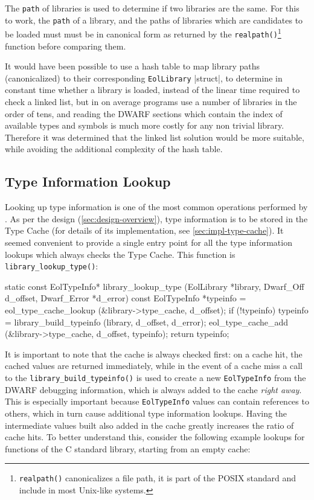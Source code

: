 The \verb|path| of libraries is used to determine if two libraries are the
same. For this to work, the \verb|path| of a library, and the paths of
libraries which are candidates to be loaded must must be in canonical form
as returned by the \verb|realpath()|\footnote{\texttt{realpath()}
canonicalizes a file path, it is part of the POSIX standard and include in
most Unix-like systems.} function before comparing them.

It would have been possible to use a hash table to map library paths
(canonicalized) to their corresponding \verb|EolLibrary| \Mc|struct|, to
determine in constant time whether a library is loaded, instead of the linear
time required to check a linked list, but in on average programs use a number
of libraries in the order of tens, and reading the DWARF sections which
contain the index of available types and symbols is much more costly for any
non trivial library. Therefore it was determined that the linked list solution
would be more suitable, while avoiding the additional complexity of the hash
table.


\subsection{Type Information Lookup}

Looking up type information is one of the most common operations performed by
\Eol*. As per the design (\ref{sec:design-overview}), type information is to
be stored in the \textsf{Type Cache} (for details of its implementation, see
\ref{sec:impl-type-cache}). It seemed convenient to provide a single entry
point for all the type information lookups which always checks the
\textsf{Type Cache}. This function is \verb|library_lookup_type()|:

\begin{ccode}
static const EolTypeInfo*
library_lookup_type (EolLibrary  *library,
                     Dwarf_Off    d_offset,
                     Dwarf_Error *d_error) {
    const EolTypeInfo *typeinfo =
            eol_type_cache_lookup (&library->type_cache, d_offset);
    if (!typeinfo) {
        typeinfo = library_build_typeinfo (library, d_offset, d_error);
        eol_type_cache_add (&library->type_cache, d_offset, typeinfo);
    }
    return typeinfo;
}
\end{ccode}

It is important to note that the cache is always checked first: on a cache
hit, the cached values are returned immediately, while in the event of a cache
miss a call to the \verb|library_build_typeinfo()| is used to create a new
\verb|EolTypeInfo| from the DWARF debugging information, which is always added
to the cache \emph{right away}. This is especially important because
\verb|EolTypeInfo| values can contain references to others, which in turn
cause additional type information lookups. Having the intermediate values
built also added in the cache greatly increases the ratio of cache hits. To
better understand this, consider the following example lookups for functions
of the C standard library, starting from an empty cache:

